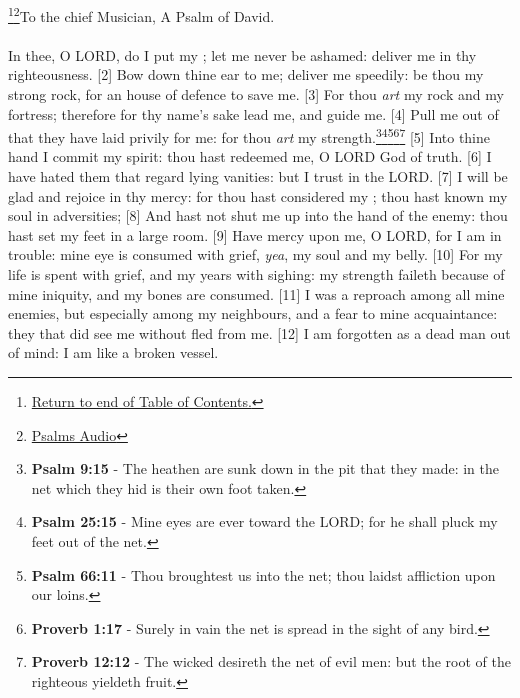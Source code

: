 \footnote{\textcolor[cmyk]{0.99998,1,0,0}{\hyperlink{TOC}{Return to end of Table of Contents.}}}\footnote{\href{https://audiobible.com/bible}{\textcolor[cmyk]{0.99998,1,0,0}{Psalms Audio}}}\textcolor[cmyk]{0.99998,1,0,0}{To the chief Musician, A Psalm of David.}\\
\\
\textcolor[cmyk]{0.99998,1,0,0}{In thee, O LORD, do I put my ; let me never be ashamed: deliver me in thy righteousness.}
[2] \textcolor[cmyk]{0.99998,1,0,0}{Bow down thine ear to me; deliver me speedily: be thou my strong rock, for an house of defence to save me.}
[3] \textcolor[cmyk]{0.99998,1,0,0}{For thou \emph{art} my rock and my fortress; therefore for thy name's sake lead me, and guide me.}
[4] \textcolor[cmyk]{0.99998,1,0,0}{Pull me out of  that they have laid privily for me: for thou \emph{art} my strength.}\footnote{\textbf{Psalm 9:15} - The heathen are sunk down in the pit that they made: in the net which they hid is their own foot taken.}\footnote{\textbf{Psalm 25:15} - Mine eyes are ever toward the LORD; for he shall pluck my feet out of the net.}\footnote{\textbf{Psalm 66:11} - Thou broughtest us into the net; thou laidst affliction upon our loins.}\footnote{\textbf{Proverb 1:17} - Surely in vain the net is spread in the sight of any bird.}\footnote{\textbf{Proverb 12:12} - The wicked desireth the net of evil men: but the root of the righteous yieldeth fruit.}
[5] \textcolor[cmyk]{0.99998,1,0,0}{Into thine hand I commit my spirit: thou hast redeemed me, O LORD God of truth.}
[6] \textcolor[cmyk]{0.99998,1,0,0}{I have hated them that regard lying vanities: but I trust in the LORD.}
[7] \textcolor[cmyk]{0.99998,1,0,0}{I will be glad and rejoice in thy mercy: for thou hast considered my ; thou hast known my soul in adversities;}
[8] \textcolor[cmyk]{0.99998,1,0,0}{And hast not shut me up into the hand of the enemy: thou hast set my feet in a large room.}
[9] \textcolor[cmyk]{0.99998,1,0,0}{Have mercy upon me, O LORD, for I am in trouble: mine eye is consumed with grief, \emph{yea}, my soul and my belly.}
[10] \textcolor[cmyk]{0.99998,1,0,0}{For my life is spent with grief, and my years with sighing: my strength faileth because of mine iniquity, and my bones are consumed.}
[11] \textcolor[cmyk]{0.99998,1,0,0}{I was a reproach among all mine enemies, but especially among my neighbours, and a fear to mine acquaintance: they that did see me without fled from me.}
[12] \textcolor[cmyk]{0.99998,1,0,0}{I am forgotten as a dead man out of mind: I am like a broken vessel.}
